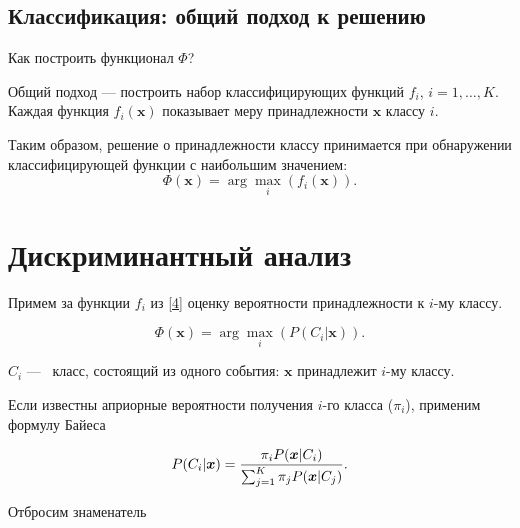 \documentclass[11pt, oneside]{article}   	%
\begin{document}

		\subsection{Классификация: общий подход к решению}
		Как построить функционал $\Phi$?
		
		
		Общий подход --- построить набор классифицирующих функций $f_i$, $i = 1, \ldots, K$. Каждая функция $f_i(\bm{x})$ показывает меру принадлежности $\bm{x}$ классу $i$. 
		
		Таким образом, решение о принадлежности классу принимается при обнаружении классифицирующей функции с наибольшим значением:
		\begin{equation}
			\Phi(\bm{x}) = \arg\max_i(f_i(\bm{x})).
			\label{4}
		\end{equation}

		\section{Дискриминантный анализ}
		Примем за функции $f_i$ из \ref{4} оценку вероятности принадлежности к $i$-му классу.
		
		$$\Phi(\bm{x}) = \arg\max_i (P(C_i|\bm{x})).$$
		
		$C_i$ ---  класс, состоящий из одного события: $\bm{x}$ принадлежит $i$-му классу.

		Если известны априорные вероятности получения $i$-го класса ($\pi_i$), применим формулу Байеса
		
		$$P(C_i|\bm{x}) = {{\pi_i P(\bm{x}|C_i)}\over{\sum_{j=1}^{K} \pi_j P(\bm{x}|C_j)}}.$$
		 
		 Отбросим знаменатель
		
\end{document}
